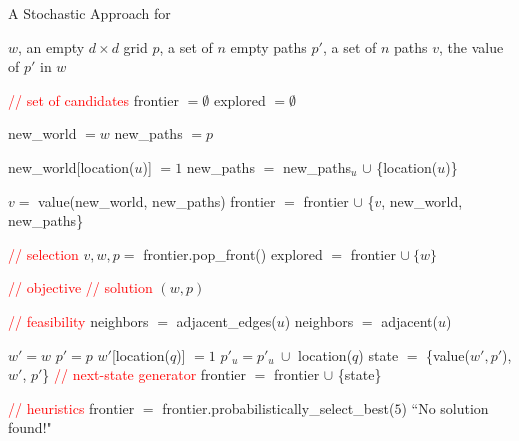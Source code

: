 \documentclass[../main.tex]{subfiles}
\begin{document}
\begin{algorithm}
\caption{A Stochastic Approach for \prob}
\label{fig:sto-pseudocode}
    \begin{algorithmic}[1]
        \REQUIRE $w$, an empty $d\times d$ grid
        \REQUIRE $p$, a set of $n$ empty paths
        \ENSURE $p'$, a set of $n$ paths
        \ENSURE $v$, the value of $p'$ in $w$

        \STATE \textcolor{red}{// set of candidates}
        \STATE frontier $=\emptyset$
        \STATE explored $=\emptyset$

            \STATE new\_world $=w$
            \STATE new\_paths $=p$

                \STATE new\_world[location($u$)] $=1$
                \STATE new\_paths $=$ new\_paths$_u$ $\cup$ \{location($u$)\}
            \ENDFOR

            \STATE $v=$ value(new\_world, new\_paths)
            \STATE frontier $=$ frontier $\cup$ \{$v$, new\_world, new\_paths\}
        \ENDFOR

            \STATE \textcolor{red}{// selection}
            \STATE $v,w,p=$ frontier.pop\_front()
            \STATE explored $=$ frontier $\cup\ \{w\}$

            \STATE \textcolor{red}{// objective}
                \STATE \textcolor{red}{// solution}
                \RETURN $(w,p)$
            \ENDIF

            \STATE \textcolor{red}{// feasibility}
                    \STATE neighbors $=$ adjacent\_edges($u$)
                \ELSE
                    \STATE neighbors $=$ adjacent($u$)
                \ENDIF

                    \STATE $w'=w$
                    \STATE $p'=p$
                    \STATE $w'$[location($q$)] $=1$
                    \STATE $p'_u=p'_u\ \cup$ location($q$)
                    \STATE state $=$ \{value($w',p'$), $w'$, $p'$\}
                    \STATE \textcolor{red}{// next-state generator}
                        \STATE frontier $=$ frontier $\cup$ \{state\}
                    \ENDIF
                \ENDFOR
            \ENDFOR

            \STATE \textcolor{red}{// heuristics}
            \STATE frontier $=$ frontier.probabilistically\_select\_best($5$)
        \ENDWHILE
        \RETURN ``No solution found!"
    \end{algorithmic}
\end{algorithm}
\end{document}
